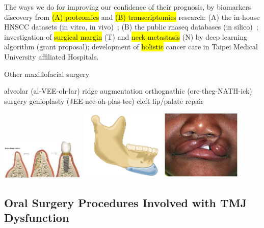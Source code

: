 \documentclass[
paper=landscape,
paper=160mm:90mm, %
fontsize=11pt, %
pagesize, %
parskip=half-, %
]{scrartcl} %
\theoremstyle{mythmstyle} %
\begin{document}
\begin{outline}
\0 The ways we do for improving our confidence of their prognosis, by
\1 biomarkers discovery from \hl{(A) proteomics} and \hl{(B) transcriptomics} research:
    \2 (A) the in-house HNSCC datasets (in vitro, in vivo)~\parencite{Chi2017};
    \2 (B) the public \acrfull{rnaseq} databases (in silico)~\autocite{Chi2021};
\1 investigation of \hl{surgical margin} (T) and \hl{neck metastasis} (N) by deep learning algorithm (grant proposal);
\1 development of \hl{holistic} cancer care in Taipei Medical University affiliated Hospitals.

\end{outline}
\clearpage
\begin{outline}
\0 Other maxillofacial surgery

\1 alveolar (al-VEE-oh-lar) ridge augmentation
\1 orthognathic (ore-theg-NATH-ick) surgery
    \2 genioplasty (JEE-nee-oh-plas-tee)
\1 cleft lip/palate repair
\end{outline}
\includegraphics[width=4cm]{ridge_augmentation.png}
\includegraphics[width=4cm]{genioplasty.png}
\includegraphics[width=4cm]{cleft.png}

\clearpage
\subsection{Oral Surgery Procedures Involved with TMJ Dysfunction}
\end{document}

